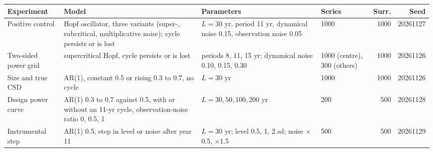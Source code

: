 \begin{tabular}{p{2.1cm}p{3.1cm}p{3.4cm}p{1.5cm}rr}
\hline
Experiment & Model & Parameters & Series & Surr. & Seed \\
\hline
Positive control & Hopf oscillator, three variants (super-, subcritical, multiplicative noise); cycle persists or is lost & $L=30$ yr, period 11 yr, dynamical noise 0.15, observation noise 0.05 & 1000 & 1000 & 20261127 \\
Two-sided power grid & supercritical Hopf, cycle persists or is lost & periods 8, 11, 15 yr; dynamical noise 0.10, 0.15, 0.30 & 1000 (centre), 300 (others) & 1000 & 20261126 \\
Size and true CSD & AR(1), constant 0.5 or rising 0.3 to 0.7, no cycle & $L=30$ yr & 1000 & 1000 & 20261126 \\
Design power curve & AR(1) 0.3 to 0.7 against 0.5, with or without an 11-yr cycle, observation-noise ratio 0, 0.5, 1 & $L = 30, 50, 100, 200$ yr & 200 & 500 & 20261128 \\
Instrumental step & AR(1) 0.5, step in level or noise after year 11 & $L=30$ yr; level 0.5, 1, 2 sd; noise $\times$0.5, $\times$1.5 & 500 & 500 & 20261129 \\
\hline
\end{tabular}
